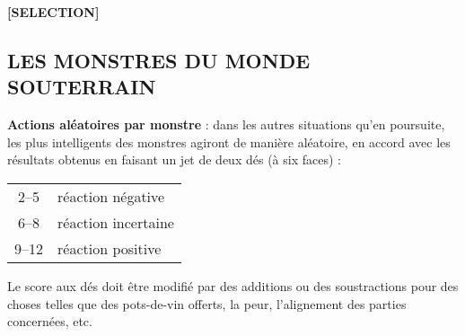 \begin{center}
\textbf{[SELECTION]}
\end{center}

\subsection*{LES MONSTRES DU MONDE SOUTERRAIN}

\label{dd3-actions-monstres}\textbf{Actions aléatoires par monstre} : dans les autres situations qu'en poursuite, les plus intelligents des monstres agiront de manière aléatoire, en accord avec les résultats obtenus en faisant un jet de deux dés (à six faces) :

\bigskip

{\parindent6cm \begin{tabular}{cl}
2--5 & réaction négative \\
6--8 & réaction incertaine \\
9--12 & réaction positive \\
\end{tabular}}

\medskip

Le score aux dés doit être modifié par des additions ou des soustractions pour des choses telles que des pots-de-vin offerts, la peur, l'alignement des parties concernées, etc.

